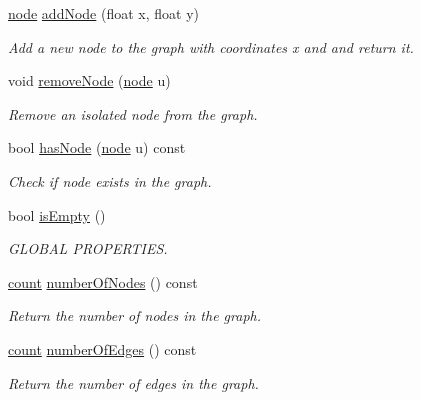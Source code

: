 \begin{DoxyCompactItemize}
\hyperlink{namespace_networ_kit_a53fe3e4fd04ea024160e4d024dfebadf}{node} \hyperlink{class_networ_kit_1_1_graph_ac5ca224bf38729880c4b120b0a7d323a}{add\-Node} (float x, float y)
\begin{DoxyCompactList}\small\item\em Add a new node to the graph with coordinates {\itshape x} and  and return it. \end{DoxyCompactList}\item 
void \hyperlink{class_networ_kit_1_1_graph_a59e9eec7fb6ad4b7983d65587e64c326}{remove\-Node} (\hyperlink{namespace_networ_kit_a53fe3e4fd04ea024160e4d024dfebadf}{node} u)
\begin{DoxyCompactList}\small\item\em Remove an isolated node from the graph. \end{DoxyCompactList}\item 
bool \hyperlink{class_networ_kit_1_1_graph_ad76b1b80e7178b9ed5fa50ce9769dd2f}{has\-Node} (\hyperlink{namespace_networ_kit_a53fe3e4fd04ea024160e4d024dfebadf}{node} u) const 
\begin{DoxyCompactList}\small\item\em Check if node exists in the graph. \end{DoxyCompactList}\item 
bool \hyperlink{class_networ_kit_1_1_graph_a14c01e09942d12db12f3ff6efc8f63aa}{is\-Empty} ()
\begin{DoxyCompactList}\small\item\em G\-L\-O\-B\-A\-L P\-R\-O\-P\-E\-R\-T\-I\-E\-S. \end{DoxyCompactList}\item 
\hyperlink{namespace_networ_kit_a76b399edfa50ae72e4aa86007aaa800a}{count} \hyperlink{class_networ_kit_1_1_graph_a51116a5b4f687b0ea01d4b681305483b}{number\-Of\-Nodes} () const 
\begin{DoxyCompactList}\small\item\em Return the number of nodes in the graph. \end{DoxyCompactList}\item 
\hyperlink{namespace_networ_kit_a76b399edfa50ae72e4aa86007aaa800a}{count} \hyperlink{class_networ_kit_1_1_graph_a04553cda092cc1373d95f2febfbfe1d2}{number\-Of\-Edges} () const 
\begin{DoxyCompactList}\small\item\em Return the number of edges in the graph. \end{DoxyCompactList}\item 

\end{DoxyCompactItemize}
